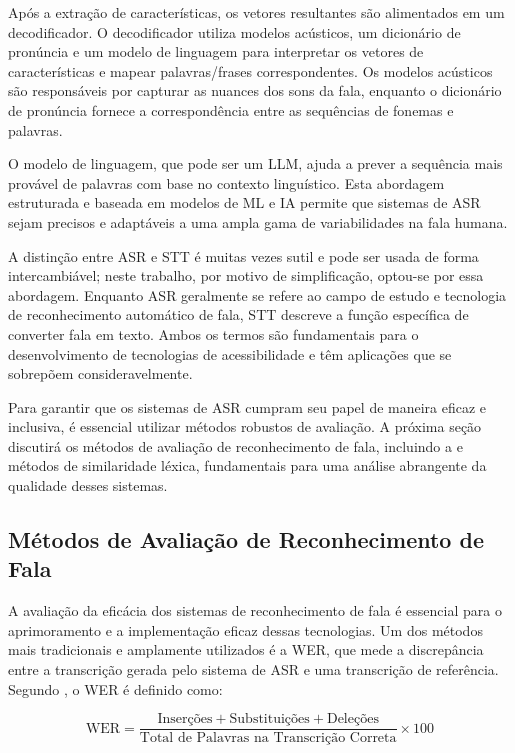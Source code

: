 Após a extração de características, os vetores resultantes são alimentados em um decodificador. O decodificador utiliza modelos acústicos, um dicionário de pronúncia e um modelo de linguagem para interpretar os vetores de características e mapear palavras/frases correspondentes. Os modelos acústicos são responsáveis por capturar as nuances dos sons da fala, enquanto o dicionário de pronúncia fornece a correspondência entre as sequências de fonemas e palavras.

O modelo de linguagem, que pode ser um LLM, ajuda a prever a sequência mais provável de palavras com base no contexto linguístico. Esta abordagem estruturada e baseada em modelos de ML e IA permite que sistemas de ASR sejam precisos e adaptáveis a uma ampla gama de variabilidades na fala humana.

A distinção entre ASR e STT é muitas vezes sutil e pode ser usada de forma intercambiável; neste trabalho, por motivo de simplificação, optou-se por essa abordagem. Enquanto ASR geralmente se refere ao campo de estudo e tecnologia de reconhecimento automático de fala, STT descreve a função específica de converter fala em texto. Ambos os termos são fundamentais para o desenvolvimento de tecnologias de acessibilidade e têm aplicações que se sobrepõem consideravelmente.

Para garantir que os sistemas de ASR cumpram seu papel de maneira eficaz e inclusiva, é essencial utilizar métodos robustos de avaliação. A próxima seção discutirá os métodos de avaliação de reconhecimento de fala, incluindo a  e métodos de similaridade léxica, fundamentais para uma análise abrangente da qualidade desses sistemas.

\subsection{Métodos de Avaliação de Reconhecimento de Fala}

A avaliação da eficácia dos sistemas de reconhecimento de fala é essencial para o aprimoramento e a implementação eficaz dessas tecnologias. Um dos métodos mais tradicionais e amplamente utilizados é a WER, que mede a discrepância entre a transcrição gerada pelo sistema de ASR e uma transcrição de referência. Segundo \cite{Jurafsky2024}, o WER é definido como:

\[
\text{WER} = \frac{\text{Inserções} + \text{Substituições} + \text{Deleções}}{\text{Total de Palavras na Transcrição Correta}} \times 100
\]


